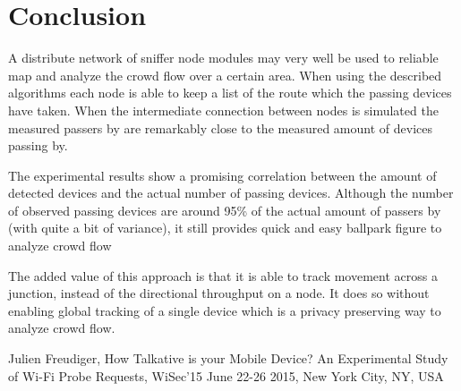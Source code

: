 \documentclass{IEEEtran}
\begin{document}
\section{Conclusion}
A distribute network of sniffer node modules may very well be used to reliable map and analyze the crowd flow over a certain area. When using the described algorithms each node is able to keep a list of the route which the passing devices have taken. When the intermediate connection between nodes is simulated the measured passers by are remarkably close to the measured amount of devices passing by.

The experimental results show a promising correlation between the amount of detected devices and the actual number of passing devices. Although the number of observed  passing devices are around 95\% of the actual amount of passers by (with quite a bit of variance), it still provides quick and easy ballpark figure to analyze crowd flow

The added value of this approach is that it is able to track movement across a junction, instead of the directional throughput on a node. It does so without enabling global tracking of a single device which is a privacy preserving way to analyze crowd flow.

\begin{thebibliography}{99}

 Julien Freudiger, How Talkative is your Mobile Device? An Experimental Study of Wi-Fi Probe Requests, WiSec’15 June 22-26 2015, New York City, NY, USA

\end{thebibliography}
\end{document}
